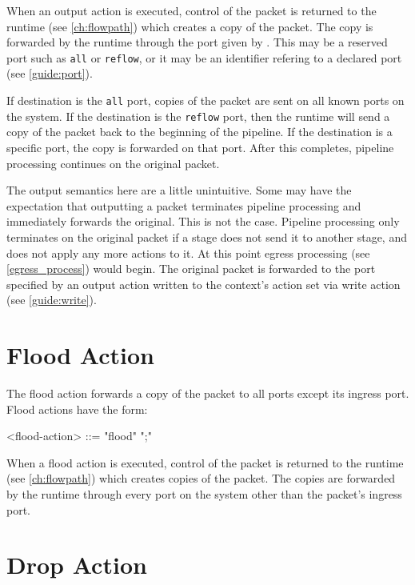When an output action is executed, control of the packet is returned to the runtime (see \ref{ch:flowpath}) which creates a copy of the packet. The copy is forwarded by the runtime through the port given by . This may be a reserved port such as \texttt{all} or \texttt{reflow}, or it may be an identifier refering to a declared port (see \ref{guide:port}).

If destination is the \texttt{all} port, copies of the packet are sent on all known ports on the system. If the destination is the \texttt{reflow} port, then the runtime will send a copy of the packet back to the beginning of the pipeline. If the destination is a specific port, the copy is forwarded on that port. After this completes, pipeline processing continues on the original packet.

The output semantics here are a little unintuitive. Some may have the expectation that outputting a packet terminates pipeline processing and immediately forwards the original. This is not the case. Pipeline processing only terminates on the original packet if a stage does not send it to another stage, and does not apply any more actions to it. At this point egress processing (see \ref{egress_process}) would begin. The original packet is forwarded to the port specified by an output action written to the context's action set via write action (see \ref{guide:write}).

\section{Flood Action} \label{guide:flood}

The flood action forwards a copy of the packet to all ports except its ingress port. Flood actions have the form:

\begin{minip}
\begin{grammar}
<flood-action> ::= "flood" ";"
\end{grammar}
\end{minip}

When a flood action is executed, control of the packet is returned to the runtime (see \ref{ch:flowpath}) which creates copies of the packet. The copies are forwarded by the runtime through every port on the system other than the packet's ingress port.

\section{Drop Action} \label{guide:drop}


